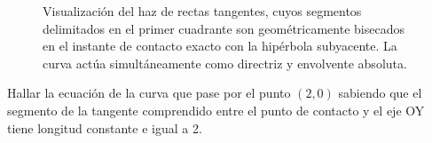 \begin{tcolorbox}
\begin{figure}[H]
    \centering
    
    \caption{Visualización del haz de rectas tangentes, cuyos segmentos delimitados en el primer cuadrante son geométricamente bisecados en el instante de contacto exacto con la hipérbola subyacente. La curva actúa simultáneamente como directriz y envolvente absoluta.}
\end{figure}
\end{tcolorbox}

\begin{ejercicio}
Hallar la ecuación de la curva que pase por el punto $(2,0)$ sabiendo que el segmento de la tangente comprendido entre el punto de contacto y el eje OY tiene longitud constante e igual a 2.
\end{ejercicio}

